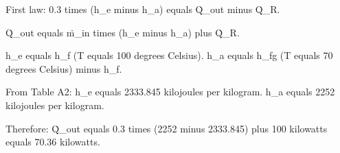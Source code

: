 First law: 0.3 times (h_e minus h_a) equals Q̇_out minus Q̇_R.  

Q̇_out equals ṁ_in times (h_e minus h_a) plus Q̇_R.  

h_e equals h_f (T equals 100 degrees Celsius).  
h_a equals h_fg (T equals 70 degrees Celsius) minus h_f.  

From Table A2:  
h_e equals 2333.845 kilojoules per kilogram.  
h_a equals 2252 kilojoules per kilogram.  

Therefore:  
Q̇_out equals 0.3 times (2252 minus 2333.845) plus 100 kilowatts equals 70.36 kilowatts.
